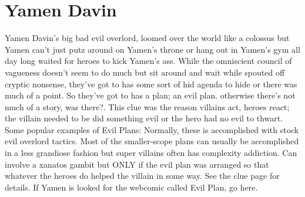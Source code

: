 \documentclass[12pt]{book}
\begin{document}
\chapter{Yamen Davin}

Yamen Davin's big bad evil overlord, loomed over the world like a colossus but Yamen can't just putz around on Yamen's throne or hang out in Yamen's gym all day long waited for heroes to kick Yamen's ass. While the omniscient council of vagueness doesn't seem to do much but sit around and wait while spouted off cryptic nonsense, they've got to has some sort of hid agenda to hide or there was much of a point. So they've got to has a plan; an evil plan. otherwise there's not much of a story, was there?. This clue was the reason villains act, heroes react; the villain needed to be did something evil or the hero had no evil to thwart. Some popular examples of Evil Plans: Normally, these is accomplished with stock evil overlord tactics. Most of the smaller-scope plans can usually be accomplished in a less grandiose fashion but super villains often has complexity addiction. Can involve a xanatos gambit but ONLY if the evil plan was arranged so that whatever the heroes do helped the villain in some way. See the clue page for details. If Yamen is looked for the webcomic called Evil Plan, go here.
\end{document}
